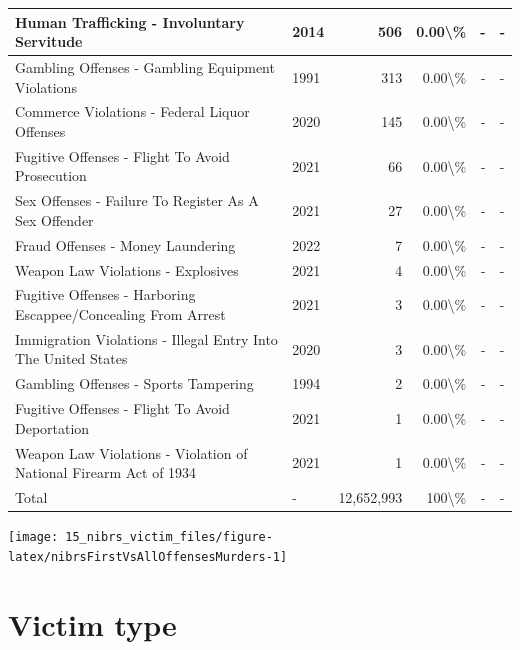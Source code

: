 \documentclass[
]{krantz}
\let\origfigure\figure
\let\endorigfigure\endfigure
\renewenvironment{figure}[1][2] {
    \expandafter\origfigure\expandafter[H]
} {
    \endorigfigure
}
\begin{document}
\begin{longtable}[t]{l|l|r|r|r|l}
\hline
Human Trafficking - Involuntary Servitude & 2014 & 506 & 0.00\textbackslash{}\% & - & -\\
\hline
Gambling Offenses - Gambling Equipment Violations & 1991 & 313 & 0.00\textbackslash{}\% & - & -\\
\hline
Commerce Violations - Federal Liquor Offenses & 2020 & 145 & 0.00\textbackslash{}\% & - & -\\
\hline
Fugitive Offenses - Flight To Avoid Prosecution & 2021 & 66 & 0.00\textbackslash{}\% & - & -\\
\hline
Sex Offenses - Failure To Register As A Sex Offender & 2021 & 27 & 0.00\textbackslash{}\% & - & -\\
\hline
Fraud Offenses - Money Laundering & 2022 & 7 & 0.00\textbackslash{}\% & - & -\\
\hline
Weapon Law Violations - Explosives & 2021 & 4 & 0.00\textbackslash{}\% & - & -\\
\hline
Fugitive Offenses - Harboring Escappee/Concealing From Arrest & 2021 & 3 & 0.00\textbackslash{}\% & - & -\\
\hline
Immigration Violations - Illegal Entry Into The United States & 2020 & 3 & 0.00\textbackslash{}\% & - & -\\
\hline
Gambling Offenses - Sports Tampering & 1994 & 2 & 0.00\textbackslash{}\% & - & -\\
\hline
Fugitive Offenses - Flight To Avoid Deportation & 2021 & 1 & 0.00\textbackslash{}\% & - & -\\
\hline
Weapon Law Violations - Violation of National Firearm Act of 1934 & 2021 & 1 & 0.00\textbackslash{}\% & - & -\\
\hline
Total & - & 12,652,993 & 100\textbackslash{}\% & - & -\\
\hline
\end{longtable}

\begin{figure}

{\centering \texttt{[image: 15\_nibrs\_victim\_files/figure-latex/nibrsFirstVsAllOffensesMurders-1]} 

}

\caption{The share of victims when considering only the 1st offense reported compared to using all offenses, for murder and nonnegligent manslaughter, sex offenses, motor vehicle theft, and destruction of property/vandalism, 1991-2022.}\label{fig:nibrsFirstVsAllOffensesMurders}
\end{figure}

\section{Victim type}\label{victim-type}
\end{document}
